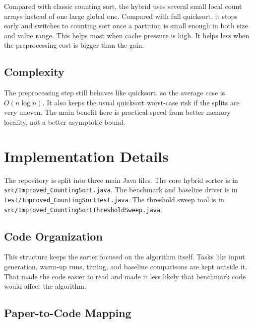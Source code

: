\documentclass[11pt]{article}
\begin{document}
    Compared with classic counting sort, the hybrid uses several small local count arrays instead
    of one large global one. Compared with full quicksort, it stops early and switches to counting
    sort once a partition is small enough in both size and value range. This helps most when cache
    pressure is high. It helps less when the preprocessing cost is bigger than the gain.

    \subsection{Complexity}

    The preprocessing step still behaves like quicksort, so the average case is $O(n\log n)$.
    It also keeps the usual quicksort worst-case risk if the splits are very uneven. The main
    benefit here is practical speed from better memory locality, not a better asymptotic bound.

    \section{Implementation Details}

    The repository is split into three main Java files. The core hybrid sorter is in
    \texttt{src/Improved\_CountingSort.java}. The benchmark and baseline driver is in
    \texttt{test/Improved\_CountingSortTest.java}. The threshold sweep tool is in
    \texttt{src/Improved\_CountingSortThresholdSweep.java}.

    \subsection{Code Organization}

    This structure keeps the sorter focused on the algorithm itself. Tasks like input generation,
    warm-up runs, timing, and baseline comparisons are kept outside it. That made the code easier
    to read and made it less likely that benchmark code would affect the algorithm.

    \subsection{Paper-to-Code Mapping}
\end{document}
